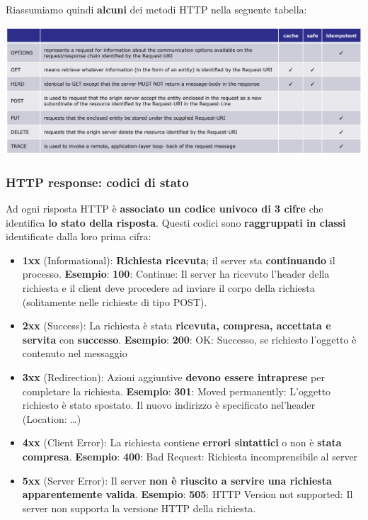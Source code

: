 \documentclass[12pt]{article}
\begin{document}
Riassumiamo quindi \textbf{alcuni} dei metodi HTTP nella seguente tabella:
\begin{center}
    \includegraphics[width = 1.15\textwidth]{Images/124.PNG}
\end{center}
\subsubsection{HTTP response: codici di stato}
Ad ogni risposta HTTP è \textbf{associato un codice univoco di 3 cifre} che identifica \textbf{lo stato della risposta}. Questi codici sono \textbf{raggruppati in classi} identificate dalla loro prima cifra:
\begin{itemize}
    \item \textbf{1xx} (Informational): \textbf{Richiesta ricevuta}; il server sta \textbf{continuando} il processo. \textbf{Esempio}: \textbf{100}: Continue: Il server ha ricevuto l'header della richiesta e il client deve procedere ad inviare il corpo della richiesta (solitamente nelle richieste di tipo POST).
    \item \textbf{2xx} (Success): La richiesta è stata \textbf{ricevuta, compresa, accettata e servita} con \textbf{successo}. \textbf{Esempio}: \textbf{200}: OK: Successo, se richiesto l’oggetto è contenuto nel messaggio
    \item \textbf{3xx} (Redirection): Azioni aggiuntive \textbf{devono essere intraprese} per completare la richiesta. \textbf{Esempio}: \textbf{301}: Moved permanently: L’oggetto richiesto è stato spostato.
          Il nuovo indirizzo è specificato nel’header (Location: …)
    \item \textbf{4xx} (Client Error): La richiesta contiene \textbf{errori sintattici} o non è \textbf{stata compresa}. \textbf{Esempio}: \textbf{400}: Bad Request: Richiesta incomprensibile al server
    \item \textbf{5xx} (Server Error): Il server \textbf{non è riuscito a servire una richiesta apparentemente valida}. \textbf{Esempio}: \textbf{505}: HTTP Version not supported: Il server non supporta la versione HTTP della richiesta.
\end{itemize}
\end{document}
